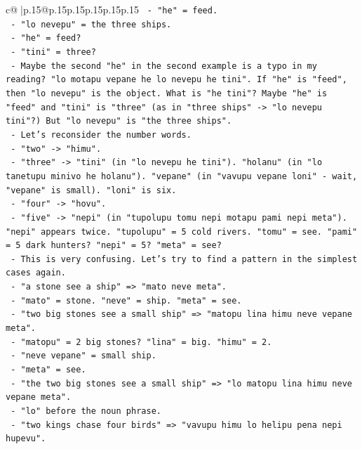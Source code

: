 \documentclass{article}
\begin{document}
{\begin{supertabular}{c@{$\;$}|p{.15\linewidth}@{}p{.15\linewidth}p{.15\linewidth}p{.15\linewidth}p{.15\linewidth}p{.15\linewidth}}
{{{\texttt{          {-} "he" = feed.} \\
\texttt{          {-} "lo nevepu" = the three ships.} \\
\texttt{          {-} "he" = feed?} \\
\texttt{          {-} "tini" = three?} \\
\texttt{        {-} Maybe the second "he" in the second example is a typo in my reading? "lo motapu vepane he lo nevepu he tini". If "he" is "feed", then "lo nevepu" is the object. What is "he tini"? Maybe "he" is "feed" and "tini" is "three" (as in "three ships" {-}> "lo nevepu tini"?) But "lo nevepu" is "the three ships".} \\
\texttt{        {-} Let's reconsider the number words.} \\
\texttt{          {-} "two" {-}> "himu".} \\
\texttt{          {-} "three" {-}> "tini" (in "lo nevepu he tini"). "holanu" (in "lo tanetupu minivo he holanu"). "vepane" (in "vavupu vepane loni" {-} wait, "vepane" is small). "loni" is six.} \\
\texttt{          {-} "four" {-}> "hovu".} \\
\texttt{          {-} "five" {-}> "nepi" (in "tupolupu tomu nepi motapu pami nepi meta"). "nepi" appears twice. "tupolupu" = 5 cold rivers. "tomu" = see. "pami" = 5 dark hunters? "nepi" = 5? "meta" = see?} \\
\texttt{          {-} This is very confusing. Let's try to find a pattern in the simplest cases again.} \\
\texttt{          {-} "a stone see a ship" => "mato neve meta".} \\
\texttt{            {-} "mato" = stone. "neve" = ship. "meta" = see.} \\
\texttt{          {-} "two big stones see a small ship" => "matopu lina himu neve vepane meta".} \\
\texttt{            {-} "matopu" = 2 big stones? "lina" = big. "himu" = 2.} \\
\texttt{            {-} "neve vepane" = small ship.} \\
\texttt{            {-} "meta" = see.} \\
\texttt{          {-} "the two big stones see a small ship" => "lo matopu lina himu neve vepane meta".} \\
\texttt{            {-} "lo" before the noun phrase.} \\
\texttt{          {-} "two kings chase four birds" => "vavupu himu lo helipu pena nepi hupevu".} \\
}}}
\end{supertabular}}
\end{document}
